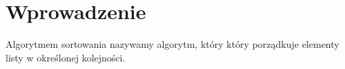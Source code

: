 \documentclass[knowledge.tex]{subfiles}
\begin{document}
    \section{Wprowadzenie}
    Algorytmem sortowania nazywamy algorytm, który który porządkuje elementy listy w określonej kolejności. 
\end{document}
